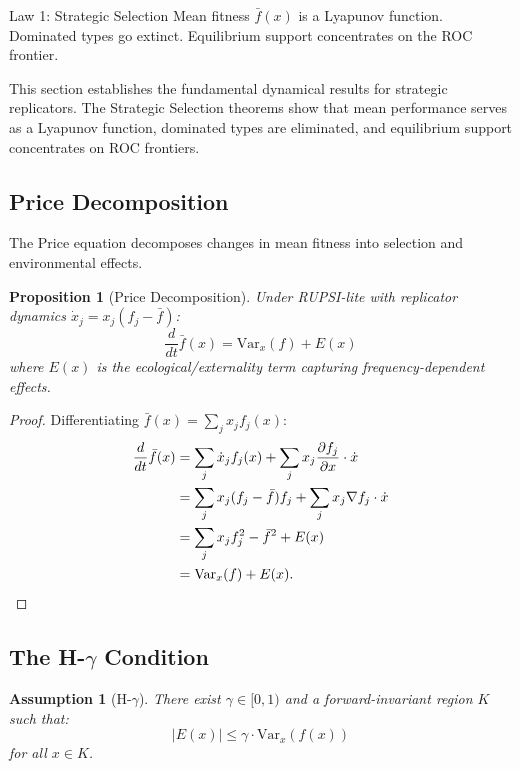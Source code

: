 \documentclass[12pt]{article}
\newtheorem{proposition}[theorem]{Proposition}
\newtheorem{assumption}[theorem]{Assumption}
\newcommand{\Var}{\mathrm{Var}}
\begin{document}
\begin{lawbox}{Law 1: Strategic Selection}
Mean fitness $\bar{f}(x)$ is a Lyapunov function. Dominated types go extinct. Equilibrium support concentrates on the ROC frontier.
\end{lawbox}

This section establishes the fundamental dynamical results for strategic replicators. The Strategic Selection theorems show that mean performance serves as a Lyapunov function, dominated types are eliminated, and equilibrium support concentrates on ROC frontiers.

\subsection{Price Decomposition}

The Price equation decomposes changes in mean fitness into selection and environmental effects.

\begin{proposition}[Price Decomposition]
\label{prop:price}
Under RUPSI-lite with replicator dynamics $\dot{x}_j = x_j(f_j - \bar{f})$:
\[
\frac{d}{dt} \bar{f}(x) = \Var_x(f) + E(x)
\]
where $E(x)$ is the ecological/externality term capturing frequency-dependent effects.
\end{proposition}

\begin{proof}
Differentiating $\bar{f}(x) = \sum_j x_j f_j(x)$:
\begin{align*}
\frac{d}{dt} \bar{f}(x) &= \sum_j \dot{x}_j f_j(x) + \sum_j x_j \frac{\partial f_j}{\partial x} \cdot \dot{x} \\
&= \sum_j x_j(f_j - \bar{f}) f_j + \sum_j x_j \nabla f_j \cdot \dot{x} \\
&= \sum_j x_j f_j^2 - \bar{f}^2 + E(x) \\
&= \Var_x(f) + E(x). \qedhere
\end{align*}
\end{proof}

\subsection{The H-$\gamma$ Condition}

\begin{assumption}[H-$\gamma$]
\label{ass:h-gamma}
There exist $\gamma \in [0, 1)$ and a forward-invariant region $K$ such that:
\[
|E(x)| \leq \gamma \cdot \Var_x(f(x))
\]
for all $x \in K$.
\end{assumption}
\end{document}
